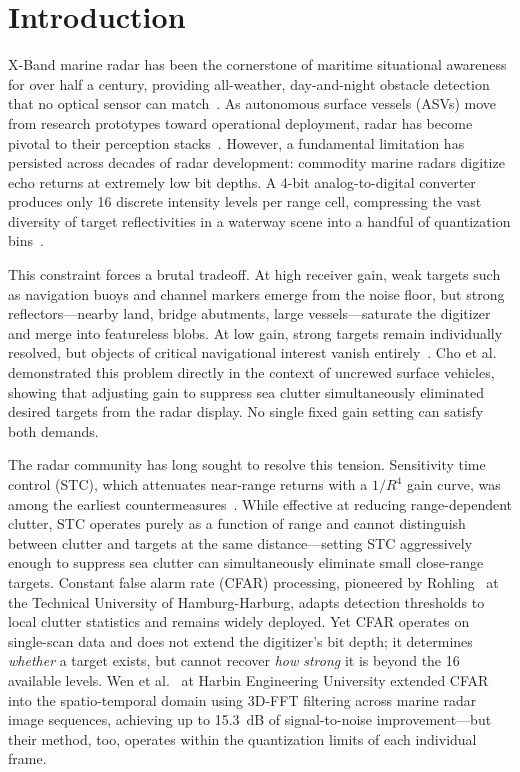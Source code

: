 \documentclass[colorlinks,upint,balance]{asmeconf}
\begin{document}
\section{Introduction}

X-Band marine radar has been the cornerstone of maritime situational awareness for over half a century, providing all-weather, day-and-night obstacle detection that no optical sensor can match~\cite{Skolnik2001Radar}. As autonomous surface vessels (ASVs) move from research prototypes toward operational deployment, radar has become pivotal to their perception stacks~\cite{Han2020ARAGON, Chung2023Pohang}. However, a fundamental limitation has persisted across decades of radar development: commodity marine radars digitize echo returns at extremely low bit depths. A 4-bit analog-to-digital converter produces only 16 discrete intensity levels per range cell, compressing the vast diversity of target reflectivities in a waterway scene into a handful of quantization bins~\cite{Skolnik2001Radar, Richards2014Fundamentals}.

This constraint forces a brutal tradeoff. At high receiver gain, weak targets such as navigation buoys and channel markers emerge from the noise floor, but strong reflectors---nearby land, bridge abutments, large vessels---saturate the digitizer and merge into featureless blobs. At low gain, strong targets remain individually resolved, but objects of critical navigational interest vanish entirely~\cite{Ward2013Marine}. Cho et al.~\cite{Cho2025AdaptiveSTC} demonstrated this problem directly in the context of uncrewed surface vehicles, showing that adjusting gain to suppress sea clutter simultaneously eliminated desired targets from the radar display. No single fixed gain setting can satisfy both demands.

The radar community has long sought to resolve this tension. Sensitivity time control (STC), which attenuates near-range returns with a $1/R^4$ gain curve, was among the earliest countermeasures~\cite{Watts2016STC}. While effective at reducing range-dependent clutter, STC operates purely as a function of range and cannot distinguish between clutter and targets at the same distance---setting STC aggressively enough to suppress sea clutter can simultaneously eliminate small close-range targets. Constant false alarm rate (CFAR) processing, pioneered by Rohling~\cite{Rohling1983CFAR} at the Technical University of Hamburg-Harburg, adapts detection thresholds to local clutter statistics and remains widely deployed. Yet CFAR operates on single-scan data and does not extend the digitizer's bit depth; it determines \textit{whether} a target exists, but cannot recover \textit{how strong} it is beyond the 16 available levels. Wen et al.~\cite{Wen2022SpatioTemporal} at Harbin Engineering University extended CFAR into the spatio-temporal domain using 3D-FFT filtering across marine radar image sequences, achieving up to 15.3~dB of signal-to-noise improvement---but their method, too, operates within the quantization limits of each individual frame.
\end{document}
